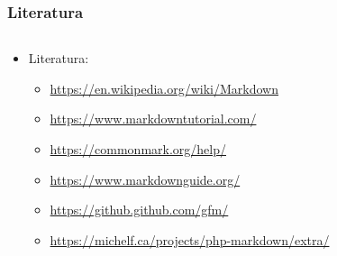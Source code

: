 \documentclass{beamer}
\begin{document}
\begin{frame}
	\frametitle{Literatura}

 	\begin{minipage}[0.2\textheight]{\textwidth}
 	\begin{columns}[T]
 	\begin{column}{0.8\textwidth}
 	\begin{itemize}
 		\item{Literatura:
 		\begin{itemize}
 			\item{\url{https://en.wikipedia.org/wiki/Markdown}}
 			\item{\url{https://www.markdowntutorial.com/}}
 			\item{\url{https://commonmark.org/help/}}
 			\item{\url{https://www.markdownguide.org/}}
 			\item{\url{https://github.github.com/gfm/}}
 			\item{\url{https://michelf.ca/projects/php-markdown/extra/}}
 		\end{itemize}}
	\end{itemize}
	\end{column}
	\end{columns}
	\end{minipage}

\end{frame}
\end{document}
